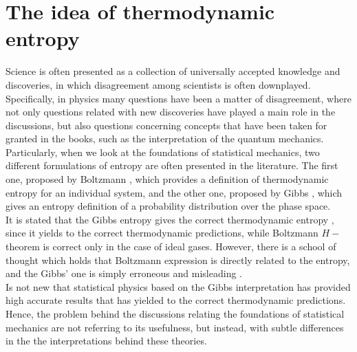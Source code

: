 \section{The idea of thermodynamic entropy}
Science is often presented as a collection of universally accepted knowledge and discoveries, in which disagreement among scientists is often downplayed.
Specifically, in physics many questions have been a matter of disagreement, where not only questions related with new discoveries have played a main role in the discussions, but also questions concerning concepts that have been taken for granted in the books, such as the interpretation of the quantum mechanics. Particularly, when we look at the foundations of statistical mechanics, two different formulations of entropy are often presented in the literature. The first one, proposed by Boltzmann \cite{boltzmann1871prioritat}, which provides a definition of thermodynamic entropy for an individual system, and the other one, proposed by Gibbs \cite{gibbs_elementary_1902}, which gives an entropy definition of a probability distribution over the phase space.\\

\indent It is stated that the Gibbs entropy gives the correct thermodynamic entropy \cite{institute1963statistical}, since it yields to the correct thermodynamic predictions, while Boltzmann $H-$theorem is correct only in the case of ideal gases. However, there is a school of thought which holds that Boltzmann expression is directly related to the entropy, and the Gibbs' one is simply erroneous and misleading \cite{ehrenfest_conceptual_1959}.\\
\indent Is not new that statistical physics based on the Gibbs interpretation has provided high accurate results that has yielded to the correct thermodynamic predictions. Hence, the problem behind the discussions relating the foundations of statistical mechanics are not referring to its usefulness, but instead, with subtle differences in the the interpretations behind these theories.

